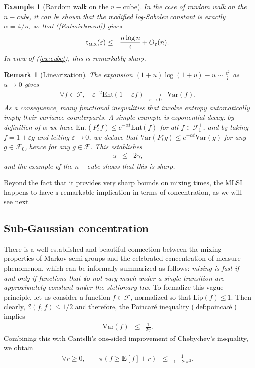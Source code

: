 \documentclass[12pt,final]{article}
\newtheorem{remark}{Remark}[section]
\newtheorem{example}{Example}[section]
\numberwithin{equation}{section}
\newcommand{\Lip}{\mathrm {Lip}}
\newcommand{\bE}{{\mathbf{E}}}
\newcommand{\Ent}{\mathrm{Ent}}
\newcommand{\Var}{\mathrm{Var}}
\newcommand{\cE}{\mathscr {E}}
\newcommand{\cF}{\mathcal {F}}
\newcommand{\tmix}{{\rm t}_{\textsc{mix}}}
\begin{document}
\begin{example}[Random walk on the $n-$cube] In the case of random walk on the $n-$cube, it can be shown that the modified log-Sobolev constant is exactly $\alpha=4/n$, so that (\ref{Entmixbound}) gives
\begin{eqnarray*}
\tmix(\varepsilon) & \le & \frac{n\log n}{4}+O_\varepsilon(n).
\end{eqnarray*}
In view of (\ref{ex:cube}), this is remarkably sharp.
\end{example}
\begin{remark}[Linearization]\label{rk:linearization}The expansion $(1+u)\log(1+u)-u\sim\frac{u^2}{2}$ as $u\to 0$ gives
\begin{eqnarray*}
\forall f\in\cF,\quad \varepsilon^{-2}\Ent(1+\varepsilon f) & \xrightarrow[\varepsilon\to 0]{} & \Var(f).
\end{eqnarray*}
As a consequence, many functional inequalities that involve entropy automatically imply their variance counterparts. A simple example is exponential decay: by definition of $\alpha$ we have $\Ent(P_t^\star f)\le e^{-\alpha t}\Ent(f)$ for all $f\in\cF^+_1$, and by taking $f=1+\varepsilon g$ and letting $\varepsilon\to 0$, we deduce that $\Var(P_t^\star g)\le e^{-\alpha t}\Var(g)$ for any $g\in\cF_0$, hence for any $g\in\cF$. This establishes 
\begin{eqnarray}
\label{MLSIvsP}
\alpha & \le & 2\gamma,
\end{eqnarray}
and the example of the $n-$cube  shows that this is sharp.
\end{remark}
Beyond the fact that it provides very sharp bounds on mixing times, the MLSI happens to have a remarkable implication in terms of concentration, as we will see next.


\subsection{Sub-Gaussian concentration}
There is a well-established and beautiful connection  between the mixing properties of Markov semi-groups and the celebrated concentration-of-measure phenomenon, which can be informally summarized as follows: \emph{mixing is fast if and only if functions that do not vary much under a single transition are approximately constant under the stationary law}. To formalize this vague principle, let us consider a function $f\in\cF$, normalized so that $\Lip(f)\le 1$. Then clearly, $\cE(f,f)\le 1/2$ and therefore, the Poincaré inequality (\ref{def:poincaré}) implies
\begin{eqnarray*}
\Var(f) & \le & \frac{1}{2\gamma}.
\end{eqnarray*}
Combining this with Cantelli's one-sided improvement of Chebychev's inequality, we obtain 
\begin{eqnarray*}
\forall r\ge 0,\qquad \pi\left(f\ge \bE[f]+r\right) & \le & \frac{1}{1+2\gamma r^2}.
\end{eqnarray*}
\end{document}
